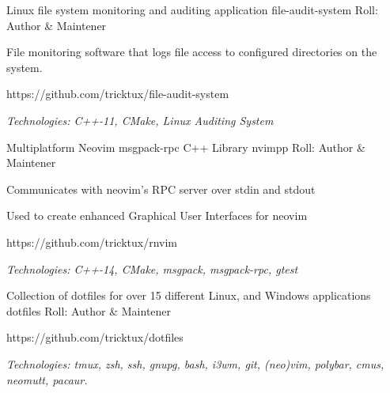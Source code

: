 

\begin{cventries}
  \cventry
  {Linux file system monitoring and auditing application} %
  {file-audit-system} %
  {} %
  {Roll: Author \& Maintener} %
  {
    \begin{cvitems} %
    \item {File monitoring software that logs file access to configured directories on the system.}
    \item {https://github.com/tricktux/file-audit-system}
    \item {\it{Technologies:} C++-11, CMake, Linux Auditing System}
    \end{cvitems}
  }

	\cventry
		{Multiplatform Neovim msgpack-rpc C++ Library} %
		{nvimpp} %
		{} %
		{Roll: Author \& Maintener} %
		{
			\begin{cvitems} %
				\item {Communicates with neovim's RPC server over stdin and stdout}
				\item {Used to create enhanced Graphical User Interfaces for neovim}
				\item {https://github.com/tricktux/rnvim}
				\item {\it{Technologies:} C++-14, CMake, msgpack, msgpack-rpc, gtest}
			\end{cvitems}
		}

  \cventry
		{Collection of dotfiles for over 15 different Linux, and Windows applications} %
    {dotfiles} %
    {} %
		{Roll: Author \& Maintener} %
    {
      \begin{cvitems} %
				\item {https://github.com/tricktux/dotfiles}
				\item {\it{Technologies:} tmux, zsh, ssh, gnupg, bash, i3wm, git, (neo)vim, polybar, cmus, neomutt, pacaur.}
      \end{cvitems}
    }


\end{cventries}

